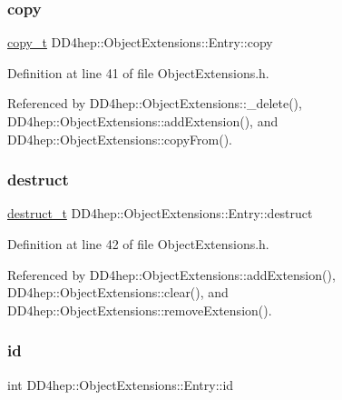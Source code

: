 \subsubsection{\texorpdfstring{copy}{copy}}
{\footnotesize\ttfamily \hyperlink{class_d_d4hep_1_1_object_extensions_afb8207da7e2d6d5e3018cc7b5c997f6d}{copy\+\_\+t} D\+D4hep\+::\+Object\+Extensions\+::\+Entry\+::copy}



Definition at line 41 of file Object\+Extensions.\+h.



Referenced by D\+D4hep\+::\+Object\+Extensions\+::\+\_\+delete(), D\+D4hep\+::\+Object\+Extensions\+::add\+Extension(), and D\+D4hep\+::\+Object\+Extensions\+::copy\+From().

\hypertarget{struct_d_d4hep_1_1_object_extensions_1_1_entry_a4a7454a4a71075f91c6c260025eaf89c}{}\label{struct_d_d4hep_1_1_object_extensions_1_1_entry_a4a7454a4a71075f91c6c260025eaf89c} 
\subsubsection{\texorpdfstring{destruct}{destruct}}
{\footnotesize\ttfamily \hyperlink{class_d_d4hep_1_1_object_extensions_a705a3524f9097577069a83993a39a9b2}{destruct\+\_\+t} D\+D4hep\+::\+Object\+Extensions\+::\+Entry\+::destruct}



Definition at line 42 of file Object\+Extensions.\+h.



Referenced by D\+D4hep\+::\+Object\+Extensions\+::add\+Extension(), D\+D4hep\+::\+Object\+Extensions\+::clear(), and D\+D4hep\+::\+Object\+Extensions\+::remove\+Extension().

\hypertarget{struct_d_d4hep_1_1_object_extensions_1_1_entry_a96f2362da856b43495f39a9d0ef48c0f}{}\label{struct_d_d4hep_1_1_object_extensions_1_1_entry_a96f2362da856b43495f39a9d0ef48c0f} 
\subsubsection{\texorpdfstring{id}{id}}
{\footnotesize\ttfamily int D\+D4hep\+::\+Object\+Extensions\+::\+Entry\+::id}



